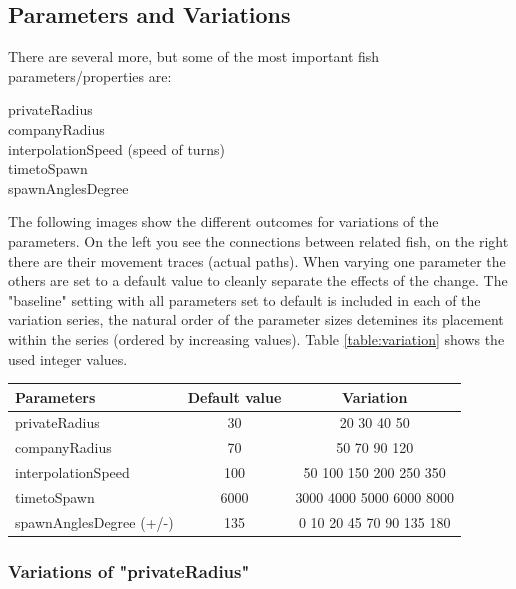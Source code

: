 \documentclass{scrartcl}
\begin{document}

\subsection{Parameters and Variations} %
There are several more, but some of the most important fish parameters/properties are:
\begin{description}
\item[privateRadius]
\item[companyRadius]
\item[interpolationSpeed (speed of turns)]
\item[timetoSpawn]
\item[spawnAnglesDegree]
\end{description}

The following images show the different outcomes for variations of the parameters. On the left you see the connections between related fish, on the right there are their movement traces (actual paths). When varying one parameter the others are set to a default value to cleanly separate the effects of the change.
The "baseline" setting with all parameters set to default is included in each of the variation series, the natural order of the parameter sizes detemines its placement within the series (ordered by increasing values). Table \ref{table:variation} shows the used integer values.

\begin{center}
\begin{tabular}{ l | c | c }
  \hline                       
  Parameters 		 & Default value 	& Variation \\
  \hline
  privateRadius 	 & 30 		& 20 30 40 50 \\
  companyRadius 	 & 70 		& 50 70 90 120 \\
  interpolationSpeed & 100 		& 50 100 150 200 250 350 \\
  timetoSpawn 		 & 6000 	& 3000 4000 5000 6000 8000 \\
  spawnAnglesDegree (+/-)  & 135 	& 0 10 20 45 70 90 135 180 \\
  \hline  
\end{tabular}
\label{table:variation}
\end{center}


\subsubsection{Variations of "privateRadius"}
\end{document}
